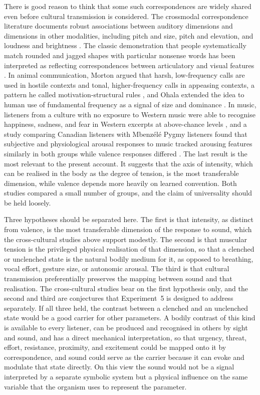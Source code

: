 \documentclass[11pt]{article}
\theoremstyle{plain}
\theoremstyle{definition}
\begin{document}
There is good reason to think that some such correspondences are widely shared even before cultural transmission is considered. The crossmodal correspondence literature documents robust associations between auditory dimensions and dimensions in other modalities, including pitch and size, pitch and elevation, and loudness and brightness \citep{spence2011}. The classic demonstration that people systematically match rounded and jagged shapes with particular nonsense words \citep{kohler1947} has been interpreted as reflecting correspondences between articulatory and visual features \citep{ramachandran2001}. In animal communication, Morton argued that harsh, low-frequency calls are used in hostile contexts and tonal, higher-frequency calls in appeasing contexts, a pattern he called motivation-structural rules \citep{morton1977}, and Ohala extended the idea to human use of fundamental frequency as a signal of size and dominance \citep{ohala1984}. In music, listeners from a culture with no exposure to Western music were able to recognise happiness, sadness, and fear in Western excerpts at above-chance levels \citep{fritz2009}, and a study comparing Canadian listeners with Mbenz\'el\'e Pygmy listeners found that subjective and physiological arousal responses to music tracked arousing features similarly in both groups while valence responses differed \citep{egermann2015}. The last result is the most relevant to the present account. It suggests that the axis of intensity, which can be realised in the body as the degree of tension, is the most transferable dimension, while valence depends more heavily on learned convention. Both studies compared a small number of groups, and the claim of universality should be held loosely.

Three hypotheses should be separated here. The first is that intensity, as distinct from valence, is the most transferable dimension of the response to sound, which the cross-cultural studies above support modestly. The second is that muscular tension is the privileged physical realisation of that dimension, so that a clenched or unclenched state is the natural bodily medium for it, as opposed to breathing, vocal effort, gesture size, or autonomic arousal. The third is that cultural transmission preferentially preserves the mapping between sound and that realisation. The cross-cultural studies bear on the first hypothesis only, and the second and third are conjectures that Experiment~5 is designed to address separately. If all three held, the contrast between a clenched and an unclenched state would be a good carrier for other parameters. A bodily contrast of this kind is available to every listener, can be produced and recognised in others by sight and sound, and has a direct mechanical interpretation, so that urgency, threat, effort, resistance, proximity, and excitement could be mapped onto it by correspondence, and sound could serve as the carrier because it can evoke and modulate that state directly. On this view the sound would not be a signal interpreted by a separate symbolic system but a physical influence on the same variable that the organism uses to represent the parameter.
\end{document}
